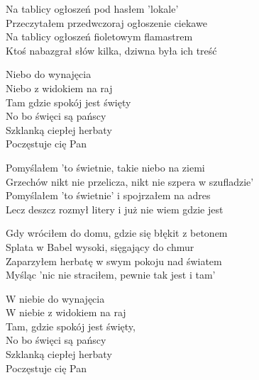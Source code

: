 \begin{text}
    \begin{smallTwo}
    Na tablicy ogłoszeń pod hasłem 'lokale'\\
    Przeczytałem przedwczoraj ogłoszenie ciekawe\\
    Na tablicy ogłoszeń fioletowym flamastrem\\
    Ktoś nabazgrał słów kilka, dziwna była ich treść

    \vin Niebo do wynajęcia\\
    \vin Niebo z widokiem na raj\\
    \vin Tam gdzie spokój jest święty\\
    \vin No bo święci są pańscy\\
    \vin Szklanką ciepłej herbaty\\
    \vin Poczęstuje cię Pan

    Pomyślałem 'to świetnie, takie niebo na ziemi\\
    Grzechów nikt nie przelicza, nikt nie szpera w szufladzie'\\
    Pomyślałem 'to świetnie' i spojrzałem na adres\\
    Lecz deszcz rozmył litery i już nie wiem gdzie jest

    Gdy wróciłem do domu, gdzie się błękit z betonem\\
    Splata w Babel wysoki, sięgający do chmur\\
    Zaparzyłem herbatę w swym pokoju nad światem\\
    Myśląc 'nic nie straciłem, pewnie tak jest i tam'

    W niebie do wynajęcia\\
    W niebie z widokiem na raj\\
    Tam, gdzie spokój jest święty,\\
    No bo święci są pańscy\\
    Szklanką ciepłej herbaty\\
    Poczęstuje cię Pan
\end{smallTwo}
\end{text}
\begin{chord}

\end{chord}